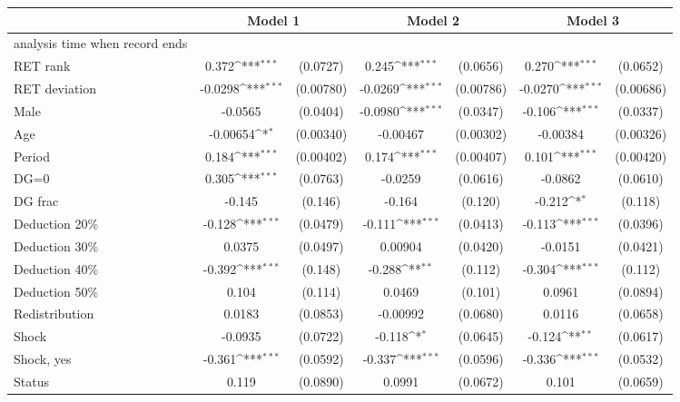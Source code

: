 {
\def\sym#1{\ifmmode^{#1}\else\(^{#1}\)\fi}
\begin{tabular}{l*{3}{cc}}
\hline\hline
                &\multicolumn{2}{c}{Model 1} &\multicolumn{2}{c}{Model 2} &\multicolumn{2}{c}{Model 3} \\
\hline
analysis time when record ends&                  &         &                  &         &                  &         \\
RET rank        &    0.372\sym{***}& (0.0727)&    0.245\sym{***}& (0.0656)&    0.270\sym{***}& (0.0652)\\
RET deviation   &  -0.0298\sym{***}&(0.00780)&  -0.0269\sym{***}&(0.00786)&  -0.0270\sym{***}&(0.00686)\\
Male            &  -0.0565         & (0.0404)&  -0.0980\sym{***}& (0.0347)&   -0.106\sym{***}& (0.0337)\\
Age             & -0.00654\sym{*}  &(0.00340)& -0.00467         &(0.00302)& -0.00384         &(0.00326)\\
Period          &    0.184\sym{***}&(0.00402)&    0.174\sym{***}&(0.00407)&    0.101\sym{***}&(0.00420)\\
DG=0            &    0.305\sym{***}& (0.0763)&  -0.0259         & (0.0616)&  -0.0862         & (0.0610)\\
DG frac         &   -0.145         &  (0.146)&   -0.164         &  (0.120)&   -0.212\sym{*}  &  (0.118)\\
Deduction 20\%  &   -0.128\sym{***}& (0.0479)&   -0.111\sym{***}& (0.0413)&   -0.113\sym{***}& (0.0396)\\
Deduction 30\%  &   0.0375         & (0.0497)&  0.00904         & (0.0420)&  -0.0151         & (0.0421)\\
Deduction 40\%  &   -0.392\sym{***}&  (0.148)&   -0.288\sym{**} &  (0.112)&   -0.304\sym{***}&  (0.112)\\
Deduction 50\%  &    0.104         &  (0.114)&   0.0469         &  (0.101)&   0.0961         & (0.0894)\\
Redistribution  &   0.0183         & (0.0853)& -0.00992         & (0.0680)&   0.0116         & (0.0658)\\
Shock           &  -0.0935         & (0.0722)&   -0.118\sym{*}  & (0.0645)&   -0.124\sym{**} & (0.0617)\\
Shock, yes      &   -0.361\sym{***}& (0.0592)&   -0.337\sym{***}& (0.0596)&   -0.336\sym{***}& (0.0532)\\
Status          &    0.119         & (0.0890)&   0.0991         & (0.0672)&    0.101         & (0.0659)\\

\end{tabular}}
